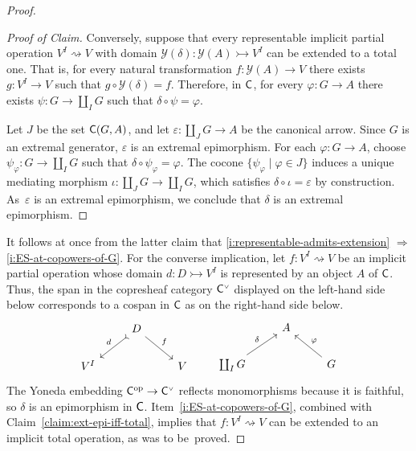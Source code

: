 \documentclass[a4paper,10pt,reqno]{amsart}
\theoremstyle{definition}
\theoremstyle{remark}
\renewcommand{\phi}{\varphi}
\renewcommand{\epsilon}{\varepsilon}
\newcommand{\cat}{{\sf C}}								%
\newcommand{\CP}[1]{{#1}^{\text{\tiny$\vee$}}}			%
\newcommand{\yo}{\mathcal{Y}}
\newcommand{\op}{{\mathrm{op}}}						%
\newcommand{\IMP}{\Rightarrow}						%
\begin{document}
\begin{proof}
\begin{proof}[Proof of Claim]
Conversely, suppose that every representable implicit partial operation $V^{I} \rightsquigarrow V$ with domain $\yo(\delta)\colon \yo(A)\rightarrowtail V^{I}$ can be extended to a total one. That is, for every natural transformation $f\colon \yo(A)\to V$ there exists $g\colon V^{I}\to V$ such that $g\circ \yo(\delta) = f$. Therefore, in $\cat$, for every $\phi\colon G\to A$ there exists $\psi\colon G\to \coprod_{I}G$ such that $\delta\circ \psi = \phi$. 

Let $J$ be the set $\cat(G,A)$, and let $\epsilon\colon \coprod_{J}G \to A$ be the canonical arrow. Since $G$ is an extremal generator, $\epsilon$ is an extremal epimorphism. For each $\phi\colon G \to A$, choose $\psi_{\phi}\colon G\to \coprod_{I}G$ such that $\delta\circ \psi_{\phi} = \phi$. The cocone $\{\psi_{\phi}\mid \phi\in J\}$ induces a unique mediating morphism $\iota\colon \coprod_{J}G \to \coprod_{I}G$, which satisfies $\delta\circ \iota = \epsilon$ by construction. As~$\epsilon$ is an extremal epimorphism, we conclude that $\delta$ is an extremal epimorphism. 
\end{proof}
%
It follows at once from the latter claim that \ref{i:representable-admits-extension} $\IMP$ \ref{i:ES-at-copowers-of-G}.
%
For the converse implication, let $f\colon V^{I}\rightsquigarrow V$ be an implicit partial operation whose domain $d\colon D\rightarrowtail V^{I}$ is represented by an object $A$ of $\cat$. 
%
Thus, the span in the copresheaf category $\CP{\cat}$ displayed on the left-hand side below corresponds to a cospan in $\cat$ as on the right-hand side below.
\begin{equation*}
\begin{tikzcd}
& D \arrow[rightarrowtail]{dl}[swap]{d} \arrow{dr}{f} & \\
V^{I} & & V
\end{tikzcd}
\ \ \ \ \ \ 
\begin{tikzcd}
& A  & \\
\coprod_{I}{G} \arrow{ur}{\delta} & & G \arrow{ul}[swap]{\phi}
\end{tikzcd}
\end{equation*}
%
The Yoneda embedding $\cat^{\op}\to \CP{\cat}$ reflects monomorphisms because it is faithful, so $\delta$ is an epimorphism in $\cat$. Item~\ref{i:ES-at-copowers-of-G}, combined with Claim~\ref{claim:ext-epi-iff-total}, implies that $f\colon V^{I}\rightsquigarrow V$ can be extended to an implicit total operation, as was to be~proved.
\end{proof}
\end{document}

